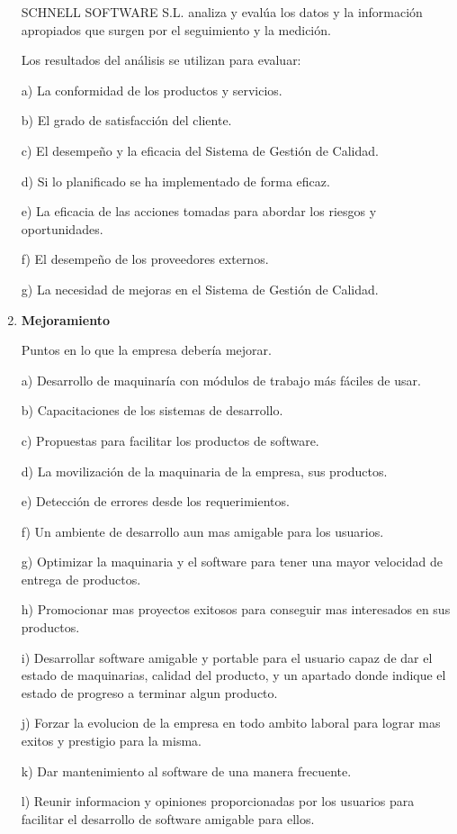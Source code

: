 \documentclass[10pt,a4paper]{article}
\begin{document}
\begin{enumerate}
SCHNELL SOFTWARE S.L. analiza y evalúa los datos y la información apropiados que surgen por el seguimiento y la
medición.

Los resultados del análisis se utilizan para evaluar:

a) La conformidad de los productos y servicios.

b) El grado de satisfacción del cliente.

c) El desempeño y la eficacia del Sistema de Gestión de Calidad.

d) Si lo planificado se ha implementado de forma eficaz.

e) La eficacia de las acciones tomadas para abordar los riesgos y oportunidades.

f) El desempeño de los proveedores externos.

g) La necesidad de mejoras en el Sistema de Gestión de Calidad.

\item \textbf{Mejoramiento}

Puntos en lo que la empresa debería mejorar.

a) Desarrollo de maquinaría con módulos de trabajo más fáciles de usar.

b) Capacitaciones de los sistemas de desarrollo.

c) Propuestas para facilitar los productos de software.

d) La movilización de la maquinaria de la empresa, sus productos.

e) Detección de errores desde los requerimientos. 

f) Un ambiente de desarrollo aun mas amigable para los usuarios.

g) Optimizar la maquinaria y el software para tener una mayor velocidad de entrega de productos.

h) Promocionar mas proyectos exitosos para conseguir mas interesados en sus productos.

i) Desarrollar software amigable y portable para el usuario capaz de dar el estado de maquinarias, calidad del producto, y un apartado donde indique el estado de progreso a terminar algun producto.

j) Forzar la evolucion de la empresa en todo ambito laboral para lograr mas exitos y prestigio para la misma.

k) Dar mantenimiento al software de una manera frecuente.

l) Reunir informacion y opiniones proporcionadas por los usuarios para facilitar el desarrollo de software amigable para ellos.

\end{enumerate}
\end{document}
